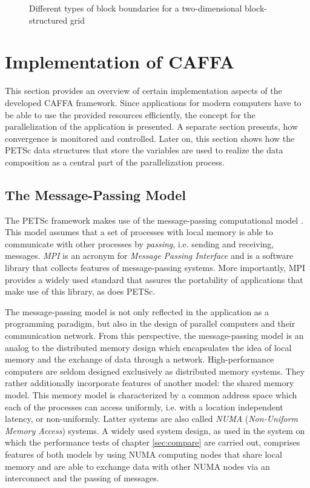 \begin{figure}[h!]
  \centering
  
  \caption{Different types of block boundaries for a two-dimensional block-structured grid}
  \label{fig:matching}
\end{figure}

\section{Implementation of CAFFA}
\label{sec:caffaimpl}

This section provides an overview of certain implementation aspects of the developed CAFFA framework. Since applications for modern computers have to be able to use the provided resources efficiently, the concept for the parallelization of the application is presented. A separate section presents, how convergence is monitored and controlled. Later on, this section shows how the PETSc data structures that store the variables are used to realize the data composition as a central part of the parallelization process.

\subsection{The Message-Passing Model}

The PETSc framework makes use of the message-passing computational model \cite{gropp99}. This model assumes that a set of processes with local memory is able to communicate with other processes by \emph{passing}, i.e. sending and receiving, messages. \emph{MPI} is an acronym for \emph{Message Passing Interface} and is a software library that collects features of message-passing systems. More importantly, MPI provides a widely used standard that assures the portability of applications that make use of this library, as does PETSc. 

The message-passing model is not only reflected in the application as a programming paradigm, but also in the design of parallel computers and their communication network. From this perspective, the message-passing model is an analog to the distributed memory design which encapsulates the idea of local memory and the exchange of data through a network. High-performance computers are seldom designed exclusively as distributed memory systems. They rather additionally incorporate features of another model: the shared memory model. This memory model is characterized by a common address space which each of the processes can access uniformly, i.e. with a location independent latency, or non-uniformly. Latter systems are also called \emph{NUMA} (\emph{Non-Uniform Memory Access}) systems. A widely used system design, as used in the system on which the performance tests of chapter \ref{sec:compare} are carried out, comprises features of both models by using NUMA computing nodes that share local memory and are able to exchange data with other NUMA nodes via an interconnect and the passing of messages.

